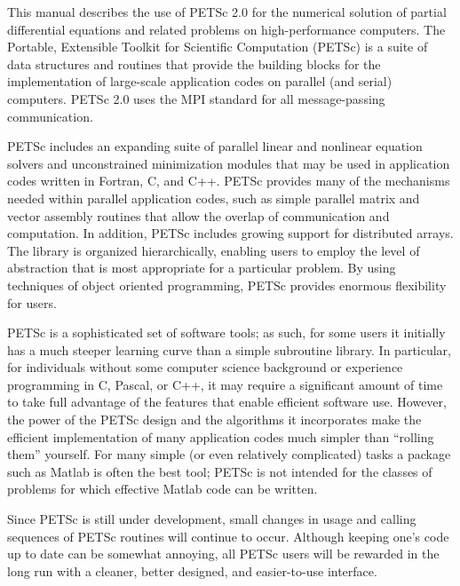 
%
%

\medskip \medskip
This manual describes the use of PETSc 2.0 for the numerical solution
of partial differential equations and related problems 
on high-performance computers.  The
Portable, Extensible Toolkit for Scientific Computation (PETSc) is a
suite of data structures and routines that provide the building
blocks for the implementation of large-scale application codes on parallel
(and serial) computers.  PETSc 2.0 uses the MPI standard for all
message-passing communication.

PETSc includes an expanding suite of parallel linear and nonlinear
equation solvers and unconstrained minimization modules that may be
used in application codes written in Fortran, C, and C++.  PETSc
provides many of the mechanisms needed within parallel application
codes, such as simple parallel matrix and vector assembly routines
that allow the overlap of communication and computation.  In addition,
PETSc includes growing support for distributed arrays.  The library is
organized hierarchically, enabling users to employ the level of
abstraction that is most appropriate for a particular problem. By
using techniques of object oriented programming, PETSc provides
enormous flexibility for users.

PETSc is a sophisticated set of software tools; as such, for some
users it initially has a much steeper learning curve than a
simple subroutine library. In particular, for individuals without some
computer science background or experience programming in C,
Pascal, or C++, it may require a significant amount of time to take full
advantage of the features that enable efficient software use.
However, the power of the PETSc design and
the algorithms it incorporates make the efficient implementation of
many application codes much simpler than ``rolling them'' yourself.
For many simple (or even relatively complicated) tasks a package such as
Matlab is often the best tool; PETSc is not intended for the classes
of problems for which effective Matlab code can be written.

Since PETSc is still under development, small changes in usage and
calling sequences of PETSc routines will continue to occur.  Although
keeping one's code up to date can be somewhat annoying,
all PETSc users will be rewarded in the long run with a cleaner,
better designed, and easier-to-use interface.
